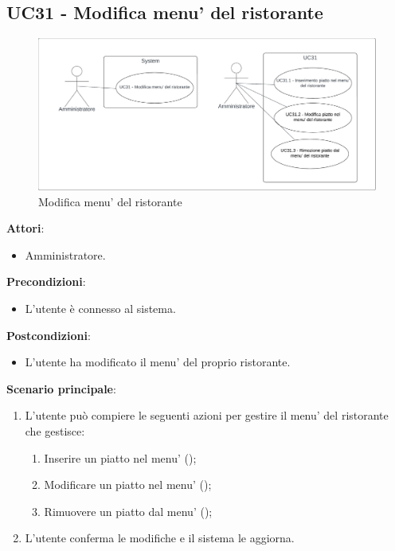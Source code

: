 \subsection{UC31 - Modifica menu' del ristorante}\label{usecase:31}
\begin{figure}[H]
    \centering
    \includegraphics[width=0.9\linewidth]{ucd/UCD31.png}
    \caption{Modifica menu' del ristorante}
\end{figure}
\textbf{Attori}:
\begin{itemize}
    \item Amministratore.
\end{itemize}
\textbf{Precondizioni}:
\begin{itemize}
    \item L'utente è connesso al sistema.
\end{itemize}
\textbf{Postcondizioni}:
\begin{itemize}
    \item L'utente ha modificato il menu' del proprio ristorante.
\end{itemize}
\textbf{Scenario principale}:
\begin{enumerate}
    \item L'utente può compiere le seguenti azioni per gestire il menu' del ristorante che gestisce:
    \begin{enumerate}
        \item Inserire un piatto nel menu' ();
        \item Modificare un piatto nel menu' ();
        \item Rimuovere un piatto dal menu' ();
    \end{enumerate}
    \item L'utente conferma le modifiche e il sistema le aggiorna.
\end{enumerate}